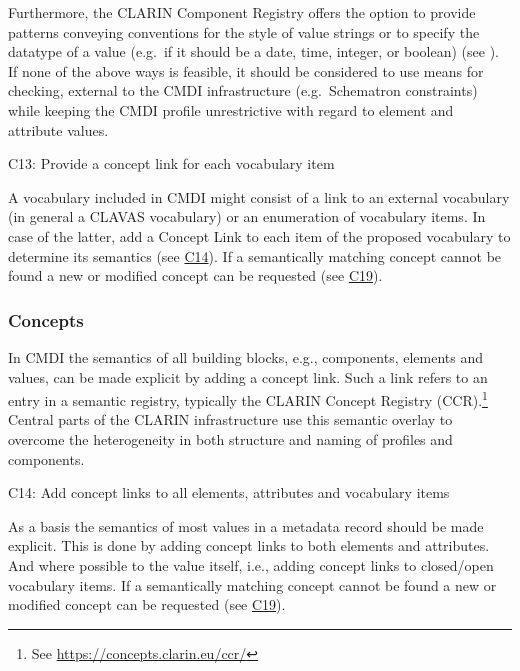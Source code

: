 Furthermore, the CLARIN Component Registry offers the option to provide patterns conveying conventions for the style of value strings or to specify the datatype of a value (e.g.~if it should be a date, time, integer, or boolean) (see ). If none of the above ways is feasible, it should be considered to use means for checking, external to the CMDI infrastructure (e.g.~Schematron constraints) while keeping the CMDI profile unrestrictive with regard to element and attribute values.

C13: Provide a concept link for each vocabulary item

 

A vocabulary included in CMDI might consist of a link to an external vocabulary (in general a CLAVAS vocabulary) or an enumeration of vocabulary items. In case of the latter, add a Concept Link to each item of the proposed vocabulary to determine its semantics (see
\hyperref[c14]{C14}). If a semantically matching concept cannot be found a new or modified concept can be requested (see \hyperref[c19]{C19}).

\subsubsection{Concepts}\label{concepts}


In CMDI the semantics of all building blocks, e.g., components, elements and values, can be made explicit by adding a concept link. Such a link refers to an entry in a semantic registry, typically the CLARIN Concept Registry (CCR).\footnote{See \url{https://concepts.clarin.eu/ccr/}}
Central parts of the CLARIN infrastructure use this semantic overlay to overcome the heterogeneity in both structure and naming of profiles and components.

\label{c14}
C14: Add concept links to all elements, attributes and vocabulary items


As a basis the semantics of most values in a metadata record should be made explicit. This is done by adding concept links to both elements and attributes. And where possible to the value itself, i.e., adding concept links to closed/open vocabulary items. If a semantically matching concept cannot be found a new or modified concept can be requested (see
\hyperref[c19]{C19}).

